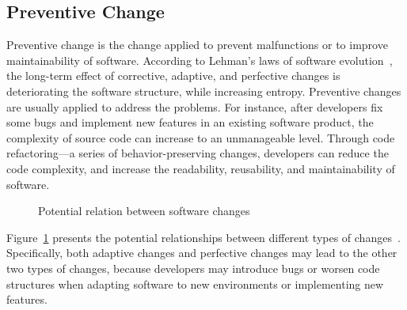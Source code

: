 \subsection{Preventive Change}
Preventive change is the change applied to prevent malfunctions or to improve maintainability of software. 
According to Lehman's laws of software evolution~\cite{Lehman1984:ULE}, the long-term effect of corrective, adaptive, and perfective changes is deteriorating the software structure, while increasing entropy. Preventive changes are usually applied to address the problems. For instance, after developers fix some bugs and implement new features in an existing software product, the complexity of source code can increase to an unmanageable level. Through code refactoring---a series of behavior-preserving changes, developers can reduce the code complexity, and increase the readability, reusability, and maintainability of software.
\begin{figure}[!htb]
\centering
{}
\caption{Potential relation between software changes~\cite{Seaman2008:SMC}}
\label{fig:relation}
\end{figure}

Figure~\ref{fig:relation} presents the potential relationships between different types of changes~\cite{Seaman2008:SMC}. Specifically, both adaptive changes and perfective changes may lead to the other two types of changes, because developers may introduce bugs or worsen code structures when adapting software to new environments or implementing new features.

